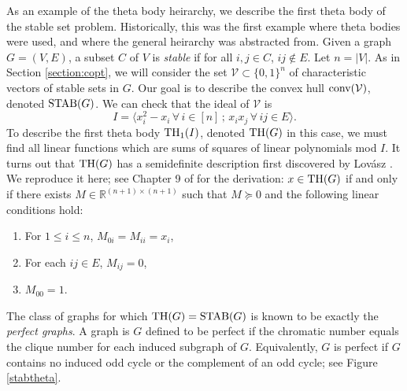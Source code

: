 As an example of the theta body heirarchy, we describe the first theta body of the stable set problem.
Historically, this was the first example where theta bodies were used, and where the general heirarchy was abstracted from.
Given a graph $G=(V,E)$, a subset $C$ of $V$ is {\em stable} if for all $i,j \in C$, $ij \notin E$. 
Let $n = |V|$.
As in Section \ref{section:copt}, we will consider the set $\mathcal{V} \subset \{0,1\}^n$ of characteristic vectors of stable sets in $G$.
Our goal is to describe the convex hull $\hbox{conv}(\mathcal{V})$, denoted $\textup{STAB}(G)$.
We can check that the ideal of $\mathcal{V}$ is 
$$I = \langle x_i^2 - x_i \, \forall \, i \in [n]\, ;\,  x_ix_j \, \forall \, ij \in E \rangle.$$
To describe the first theta body $\textup{TH}_1(I)$, denoted $\textup{TH}(G)$ in this case, we must find all linear functions which are sums of squares of linear polynomials mod $I$.
It turns out that $\textup{TH}(G)$ has a semidefinite description first discovered by Lov\'asz \cite{lovasz}.
We reproduce it here; see Chapter 9 of \cite{gls} for the derivation: $x \in \textup{TH}(G)$ if and only if there exists $M \in \mathbb{R}^{(n + 1) \times (n + 1)}$
such that $M \succeq 0$ and the following linear conditions hold:
\begin{enumerate}
\item For $1 \le i \le n$, $M_{0i} = M_{ii} = x_i$,
\item For each $ij \in E$, $M_{ij} = 0$,
\item $M_{00} = 1$.
\end{enumerate}

The class of graphs for which $\textup{TH}(G) = \textup{STAB}(G)$ is known to be exactly the {\em perfect graphs}.
A graph is $G$ defined to be perfect if the chromatic number equals the clique number for each induced subgraph of $G$.
Equivalently, $G$ is perfect if $G$ contains no induced odd cycle or the complement of an odd cycle; see Figure \ref{stabtheta}.

